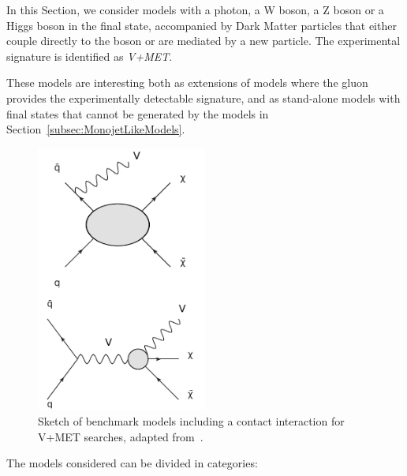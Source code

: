 
In this Section, we consider models with a photon, a W boson, a Z boson or a Higgs boson in the final state, 
accompanied by Dark Matter particles that either couple directly to the boson or are mediated by 
a new particle. The experimental signature is identified as \textit{V+MET}. 

These models are interesting both as extensions of models where the gluon provides 
the experimentally detectable signature, 
and as stand-alone models with final states that cannot be generated by the models in
Section~\ref{subsec:MonojetLikeModels}.


\begin{figure}[h!]
  \centering
    \includegraphics[width=0.5\textwidth]{figures/VPlusMET_EFT}
  \caption{Sketch of benchmark models including a contact interaction 
  for V+MET searches, adapted from~\cite{Nelson:2013pqa}. \label{fig:VPlusMET_EFT}}
\end{figure}
% 
The models considered can be divided in categories:
